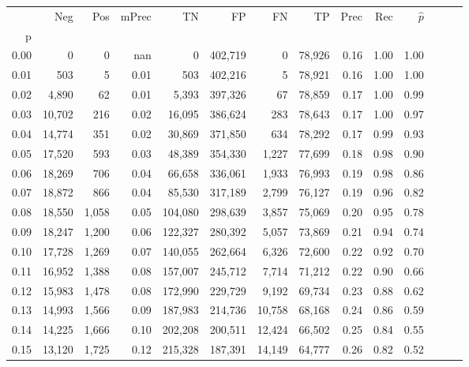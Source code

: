 \begin{tabular}{rrrrrrrrrrrrrr}
\toprule
{} &     Neg &    Pos & mPrec &       TN &       FP &      FN &      TP &  Prec &   Rec & $\hat{p}$ \\
p    &         &        &       &          &          &         &         &       &       &           \\
\midrule
0.00 &       0 &      0 &   nan &        0 &  402,719 &       0 &  78,926 &  0.16 &  1.00 &      1.00 \\
0.01 &     503 &      5 &  0.01 &      503 &  402,216 &       5 &  78,921 &  0.16 &  1.00 &      1.00 \\
0.02 &   4,890 &     62 &  0.01 &    5,393 &  397,326 &      67 &  78,859 &  0.17 &  1.00 &      0.99 \\
0.03 &  10,702 &    216 &  0.02 &   16,095 &  386,624 &     283 &  78,643 &  0.17 &  1.00 &      0.97 \\
0.04 &  14,774 &    351 &  0.02 &   30,869 &  371,850 &     634 &  78,292 &  0.17 &  0.99 &      0.93 \\
0.05 &  17,520 &    593 &  0.03 &   48,389 &  354,330 &   1,227 &  77,699 &  0.18 &  0.98 &      0.90 \\
0.06 &  18,269 &    706 &  0.04 &   66,658 &  336,061 &   1,933 &  76,993 &  0.19 &  0.98 &      0.86 \\
0.07 &  18,872 &    866 &  0.04 &   85,530 &  317,189 &   2,799 &  76,127 &  0.19 &  0.96 &      0.82 \\
0.08 &  18,550 &  1,058 &  0.05 &  104,080 &  298,639 &   3,857 &  75,069 &  0.20 &  0.95 &      0.78 \\
0.09 &  18,247 &  1,200 &  0.06 &  122,327 &  280,392 &   5,057 &  73,869 &  0.21 &  0.94 &      0.74 \\
0.10 &  17,728 &  1,269 &  0.07 &  140,055 &  262,664 &   6,326 &  72,600 &  0.22 &  0.92 &      0.70 \\
0.11 &  16,952 &  1,388 &  0.08 &  157,007 &  245,712 &   7,714 &  71,212 &  0.22 &  0.90 &      0.66 \\
0.12 &  15,983 &  1,478 &  0.08 &  172,990 &  229,729 &   9,192 &  69,734 &  0.23 &  0.88 &      0.62 \\
0.13 &  14,993 &  1,566 &  0.09 &  187,983 &  214,736 &  10,758 &  68,168 &  0.24 &  0.86 &      0.59 \\
0.14 &  14,225 &  1,666 &  0.10 &  202,208 &  200,511 &  12,424 &  66,502 &  0.25 &  0.84 &      0.55 \\
0.15 &  13,120 &  1,725 &  0.12 &  215,328 &  187,391 &  14,149 &  64,777 &  0.26 &  0.82 &      0.52 \\

\end{tabular}

